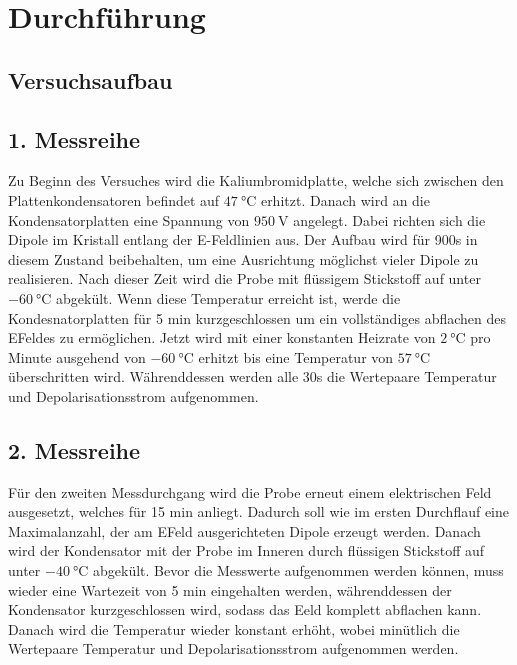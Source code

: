 \section{Durchführung}
\label{sec:Durchführung}

\subsection{Versuchsaufbau}


\subsection{1. Messreihe}

Zu Beginn des Versuches wird die Kaliumbromidplatte, welche sich zwischen den 
Plattenkondensatoren befindet auf $\SI{47}{\celsius}$ erhitzt.
Danach wird an die Kondensatorplatten eine Spannung von $\SI{950}{\volt}$ angelegt. 
Dabei richten sich die Dipole im Kristall entlang der E-Feldlinien aus.
Der Aufbau wird für 900s in diesem Zustand beibehalten, um eine 
Ausrichtung möglichst vieler Dipole zu realisieren.
Nach dieser Zeit wird die Probe mit flüssigem Stickstoff auf unter $\SI{-60}{\celsius}$ abgekült.
Wenn diese Temperatur erreicht ist, werde die Kondesnatorplatten für 5 min kurzgeschlossen
um ein vollständiges abflachen des EFeldes zu ermöglichen.
Jetzt wird mit einer konstanten Heizrate von $\SI{2}{\celsius}$ pro Minute ausgehend von 
$\SI{-60}{\celsius}$ erhitzt bis eine Temperatur von $\SI{57}{\celsius}$ überschritten wird. 
Währenddessen werden alle 30s die Wertepaare Temperatur und Depolarisationsstrom 
aufgenommen.


\subsection{2. Messreihe}

Für den zweiten Messdurchgang wird die Probe erneut einem elektrischen Feld ausgesetzt,
welches für 15 min anliegt. Dadurch soll wie im ersten Durchflauf eine Maximalanzahl,
der am EFeld ausgerichteten Dipole erzeugt werden.
Danach wird der Kondensator mit der Probe im Inneren durch flüssigen Stickstoff auf 
unter $\SI{-40}{\celsius}$ abgekült. Bevor die Messwerte aufgenommen werden können, muss wieder 
eine Wartezeit von 5 min eingehalten werden, währenddessen der Kondensator 
kurzgeschlossen wird, sodass das Eeld komplett abflachen kann.
Danach wird die Temperatur wieder konstant erhöht, wobei minütlich die Wertepaare
Temperatur und Depolarisationsstrom aufgenommen werden.